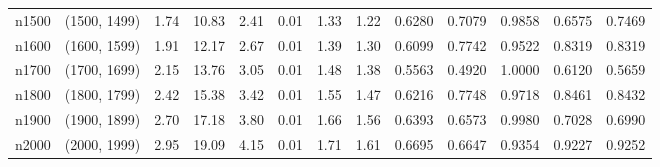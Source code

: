 \begin{tabular}{llrrrrrrrrrrr}
   n1500 & (1500, 1499) &  1.74 & 10.83 & 2.41 & 0.01 &  1.33 &   1.22 &   0.6280 &   0.7079 &    0.9858 &     0.6575 &      0.7469 \\
   n1600 & (1600, 1599) &  1.91 & 12.17 & 2.67 & 0.01 &  1.39 &   1.30 &   0.6099 &   0.7742 &    0.9522 &     0.8319 &      0.8319 \\
   n1700 & (1700, 1699) &  2.15 & 13.76 & 3.05 & 0.01 &  1.48 &   1.38 &   0.5563 &   0.4920 &    1.0000 &     0.6120 &      0.5659 \\
   n1800 & (1800, 1799) &  2.42 & 15.38 & 3.42 & 0.01 &  1.55 &   1.47 &   0.6216 &   0.7748 &    0.9718 &     0.8461 &      0.8432 \\
   n1900 & (1900, 1899) &  2.70 & 17.18 & 3.80 & 0.01 &  1.66 &   1.56 &   0.6393 &   0.6573 &    0.9980 &     0.7028 &      0.6990 \\
   n2000 & (2000, 1999) &  2.95 & 19.09 & 4.15 & 0.01 &  1.71 &   1.61 &   0.6695 &   0.6647 &    0.9354 &     0.9227 &      0.9252 \\
\bottomrule
\end{tabular}
